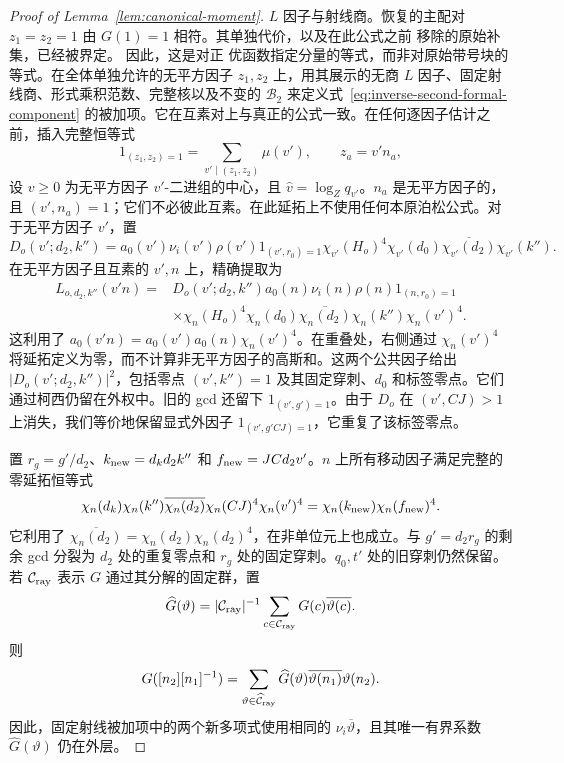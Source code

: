 \documentclass[11pt,a4paper]{article}
\numberwithin{equation}{section}
\numberwithin{figure}{section}
\theoremstyle{definition}
\theoremstyle{remark}
\begin{document}
\begin{proof}[Proof of Lemma~\ref{lem:canonical-moment}]
\(L\) 因子与射线商。恢复的主配对
\(z_1=z_2=1\) 由 \(G(1)=1\) 相符。其单独代价，以及在此公式之前
移除的原始补集，已经被界定。
因此，这是对正
优函数指定分量的等式，而非对原始带号块的等式。在全体单独允许的无平方因子 \(z_1,z_2\) 上，用其展示的无商 \(L\) 因子、固定射线商、形式乘积范数、完整核以及不变的 \(\mathcal B_2\) 来定义式~\eqref{eq:inverse-second-formal-component} 的被加项。它在互素对上与真正的公式一致。在任何逐因子估计之前，插入完整恒等式
\[
 1_{(z_1,z_2)=1}=\sum_{v'\mid(z_1,z_2)}\mu(v'),\qquad z_a=v'n_a,
\]
设 \(v\ge0\) 为无平方因子 \(v'\)-二进组的中心，且 \(\widehat v=\log_Zq_{v'}\)。\(n_a\) 是无平方因子的，且 \((v',n_a)=1\)；它们不必彼此互素。在此延拓上不使用任何本原泊松公式。对于无平方因子 \(v'\)，置
\[
 D_o(v';d_2,k'')=a_0(v')\nu_i(v')\rho(v')1_{(v',r_0)=1}
   \chi_{v'}(H_o)^4\chi_{v'}(d_0)\overline{\chi_{v'}(d_2)}\chi_{v'}(k'').
\]
在无平方因子且互素的 \(v',n\) 上，精确提取为
\begin{equation}\label{eq:inverse-second-extraction}
 \begin{split}
 L_{o,d_2,k''}(v'n)={}&D_o(v';d_2,k'')a_0(n)\nu_i(n)\rho(n)1_{(n,r_0)=1}\\
 &\times\chi_n(H_o)^4\chi_n(d_0)\overline{\chi_n(d_2)}
          \chi_n(k'')\chi_n(v')^4.
 \end{split}
\end{equation}
这利用了 \(a_0(v'n)=a_0(v')a_0(n)\chi_n(v')^4\)。在重叠处，右侧通过 \(\chi_n(v')^4\) 将延拓定义为零，而不计算非无平方因子的高斯和。这两个公共因子给出 \(|D_o(v';d_2,k'')|^2\)，包括零点 \((v',k'')=1\) 及其固定穿刺、\(d_0\) 和标签零点。它们通过柯西仍留在外权中。旧的 gcd 还留下 \(1_{(v',g')=1}\)。由于 \(D_o\) 在 \((v',CJ)>1\) 上消失，我们等价地保留显式外因子 \(1_{(v',g'CJ)=1}\)，它重复了该标签零点。

置 \(r_g=g'/d_2\)、\(k_{\rm new}=d_kd_2k''\) 和
\(f_{\rm new}=JCd_2v'\)。\(n\) 上所有移动因子满足完整的零延拓恒等式
\begin{equation}\label{eq:inverse-moving-characters}
 \chi_n(d_k)\chi_n(k'')\overline{\chi_n(d_2)}
       \chi_n(CJ)^4\chi_n(v')^4
 =\chi_n(k_{\rm new})\chi_n(f_{\rm new})^4.
\end{equation}
它利用了 \(\overline{\chi_n(d_2)}=\chi_n(d_2)\chi_n(d_2)^4\)，在非单位元上也成立。与 \(g'=d_2r_g\) 的剩余 gcd 分裂为 \(d_2\) 处的重复零点和 \(r_g\) 处的固定穿刺。\(q_0,t'\) 处的旧穿刺仍然保留。若 \(\mathcal C_{\rm ray}\) 表示 \(G\) 通过其分解的固定群，置
\[
 \widehat G(\vartheta)=|\mathcal C_{\rm ray}|^{-1}
       \sum_{c\in\mathcal C_{\rm ray}}G(c)\overline{\vartheta(c)}.
\]
则
\[
 G([n_2][n_1]^{-1})=\sum_{\vartheta\in\widehat{\mathcal C}_{\rm ray}}
   \widehat G(\vartheta)\overline{\vartheta(n_1)}\vartheta(n_2).
\]
因此，固定射线被加项中的两个新多项式使用相同的
\(\nu_i\overline\vartheta\)，且其唯一有界系数
\(\widehat G(\vartheta)\) 仍在外层。


\end{proof}
\end{document}
